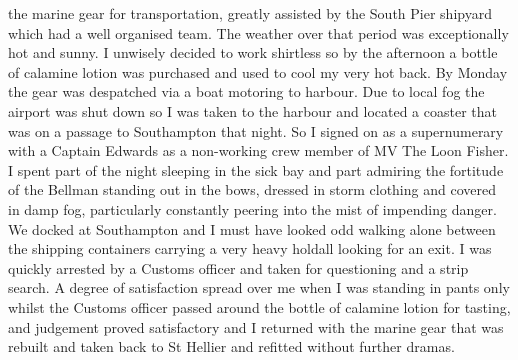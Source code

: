 the marine gear for transportation, greatly assisted by the South Pier shipyard
which had a well organised team. The weather over that period was exceptionally
hot and sunny. I unwisely decided to work shirtless so by the afternoon a
bottle of calamine lotion was purchased and used to cool my very hot back. By
Monday the gear was despatched via a boat motoring to harbour. Due to local fog
the airport was shut down so I was taken to the harbour and located a coaster
that was on a passage to Southampton that night. So I signed on as a
supernumerary with a Captain Edwards as a non-working crew member of MV The
Loon Fisher. I spent part of the night sleeping in the sick bay and part
admiring the fortitude of the Bellman standing out in the bows, dressed in
storm clothing and covered in damp fog, particularly constantly peering into
the mist of impending danger. We docked at Southampton and I must have looked
odd walking alone between the shipping containers carrying a very heavy holdall
looking for an exit. I was quickly arrested by a Customs officer and taken for
questioning and a strip search. A degree of satisfaction spread over me when I
was standing in pants only whilst the Customs officer passed around the bottle
of calamine lotion for tasting, and judgement proved satisfactory and I
returned with the marine gear that was rebuilt and taken back to St Hellier and
refitted without further dramas.

